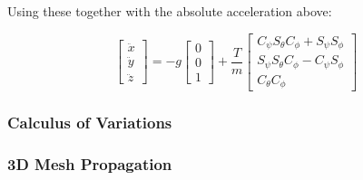 Using these together with the absolute acceleration above:

$$\left[ \begin{array}{c}{\ddot{x}} \\ {\ddot{y}} \\ {\ddot{z}}\end{array}\right]=-g \left[ \begin{array}{l}{0} \\ {0} \\ {1}\end{array}\right]+\frac{T}{m} \left[ \begin{array}{c}{C_{\psi} S_{\theta} C_{\phi}+S_{\psi} S_{\phi}} \\ {S_{\psi} S_{\theta} C_{\phi}-C_{\psi} S_{\phi}} \\ {C_{\theta} C_{\phi}}\end{array}\right]$$

\subsubsection{Calculus of Variations}
\label{sssec:3d_mesh_generation}

\subsubsection{3D Mesh Propagation}
